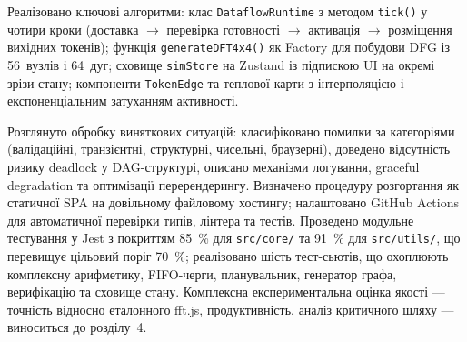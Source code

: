 Реалізовано ключові алгоритми: клас \texttt{DataflowRuntime} з методом
\texttt{tick()} у чотири кроки (доставка \(\rightarrow\) перевірка
готовності \(\rightarrow\) активація \(\rightarrow\) розміщення вихідних
токенів); функція \texttt{generateDFT4x4()} як Factory для побудови DFG
із 56~вузлів і 64~дуг; сховище \texttt{simStore} на Zustand із
підпискою UI на окремі зрізи стану; компоненти \texttt{TokenEdge} та
теплової карти з інтерполяцією і експоненціальним затуханням активності.

Розглянуто обробку виняткових ситуацій: класифіковано помилки за
категоріями (валідаційні, транзієнтні, структурні, чисельні, браузерні),
доведено відсутність ризику deadlock у DAG-структурі, описано механізми
логування, graceful degradation та оптимізації перерендерингу. Визначено
процедуру розгортання як статичної SPA на довільному файловому хостингу;
налаштовано GitHub Actions для автоматичної перевірки типів, лінтера та
тестів. Проведено модульне тестування у Jest з покриттям 85~\% для
\texttt{src/core/} та 91~\% для \texttt{src/utils/}, що перевищує
цільовий поріг 70~\%; реалізовано шість тест-сьютів, що охоплюють
комплексну арифметику, FIFO-черги, планувальник, генератор графа,
верифікацію та сховище стану. Комплексна експериментальна оцінка якості
--- точність відносно еталонного fft.js, продуктивність, аналіз
критичного шляху --- виноситься до розділу~4.